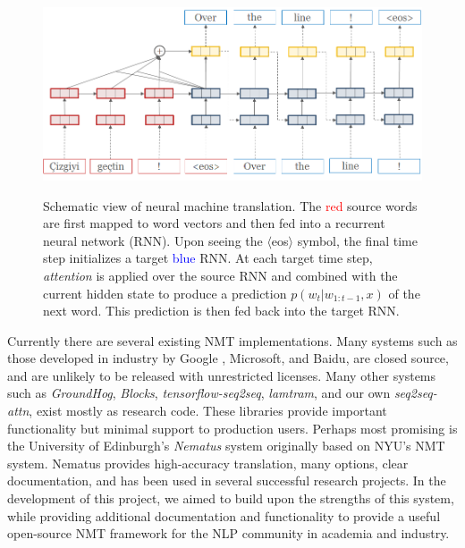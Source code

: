 \documentclass[11pt]{article}
\begin{document}
\begin{figure}
  \centering
  \includegraphics[width=\linewidth]{simple-attn}
  \label{fig:rnn}
  \caption{\small Schematic view of neural machine translation. The \textcolor{red}{red} source words are first mapped to word vectors and then fed into a recurrent neural network (RNN). Upon seeing the $\langle$eos$\rangle$ symbol, the final time step initializes a target \textcolor{blue}{blue} RNN. At each target time step, \textit{attention} is applied over the source RNN and combined with the current hidden state to produce a prediction $p(w_t| w_{1: t-1}, x)$ of the next word. This prediction is then fed back into the target RNN.}
\end{figure}


Currently there are several existing NMT implementations. Many systems
such as those developed in industry by Google \cite{wu2016google},
Microsoft, and Baidu, are closed source, and are unlikely to be
released with unrestricted licenses. Many other systems such as
\textit{GroundHog}, \textit{Blocks}, \textit{tensorflow-seq2seq}, \textit{lamtram}, and our own \textit{seq2seq-attn}, exist
mostly as research code. These libraries provide important
functionality but minimal support to production users. Perhaps most
promising is the University of Edinburgh's \textit{Nematus} system originally based on NYU's NMT system. Nematus provides high-accuracy translation, many options,
clear documentation, and has been used in several successful research
projects. In the development of this project, we aimed to build upon the strengths of this system, while providing additional documentation and functionality to provide a
useful open-source NMT framework for the NLP community in academia and
industry.
\end{document}
